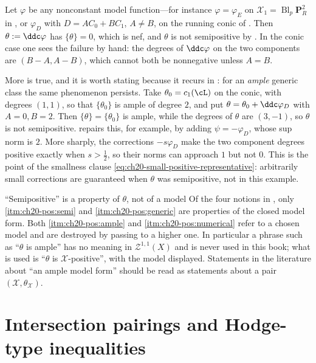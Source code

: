 \begin{example}
\label{ex:ch20-nef-generic-not-semipositive}
Let $\varphi$ be any nonconstant model function---for instance
$\varphi=\varphi_E$ on $\mathcal X_1=\operatorname{Bl}_p\mathbf P^2_R$
in , or
$\varphi_D$ with $D=AC_0+BC_1$, $A\neq B$, on the running conic of
.  Then $\theta:=\ddc\varphi$ has
$\{\theta\}=0$, which is nef, and $\theta$ is not semipositive by
.  In the conic case one sees the
failure by hand: the degrees of $\ddc\varphi$ on the two components are
$(B-A,A-B)$, which cannot both be nonnegative unless $A=B$.

More is true, and it is worth stating because it recurs in
: for an \emph{ample} generic class the same
phenomenon persists.  Take $\theta_0=c_1(\cL)$ on the conic, with degrees
$(1,1)$, so that $\{\theta_0\}$ is ample of degree $2$, and put
$\theta=\theta_0+\ddc\varphi_D$ with $A=0,B=2$.  Then
$\{\theta\}=\{\theta_0\}$ is ample, while the degrees of $\theta$ are
$(3,-1)$, so $\theta$ is not semipositive.
 repairs this, for example, by
adding $\psi=-\varphi_D$, whose sup norm is $2$.  More sharply, the
corrections $-s\varphi_D$ make the two component degrees positive exactly
when $s>\tfrac12$, so their norms can approach $1$ but not $0$.
This is the point of the smallness clause
\eqref{eq:ch20-small-positive-representative}: arbitrarily small corrections
are guaranteed when $\theta$ was semipositive, not in this example.
\end{example}

\begin{warning}{``Semipositive'' is a property of $\theta$, not of a model}
Of the four notions in , only
\cref{itm:ch20-pos:semi} and \cref{itm:ch20-pos:generic} are properties of the
closed model form.  Both \cref{itm:ch20-pos:ample} and
\cref{itm:ch20-pos:numerical} refer to a chosen model and are destroyed by
passing to a higher one.  In particular a phrase such as ``$\theta$ is
ample'' has no meaning in $\mathcal Z^{1,1}(X)$ and is never used in this
book; what is used is ``$\theta$ is $\mathcal X$-positive'', with the
model displayed.  Statements in the literature about ``an ample model
form'' should be read as statements about a pair $(\mathcal X,\theta_{\mathcal X})$.
\end{warning}

\section{Intersection pairings and Hodge-type inequalities}
\label{sec:ch20-intersection}

